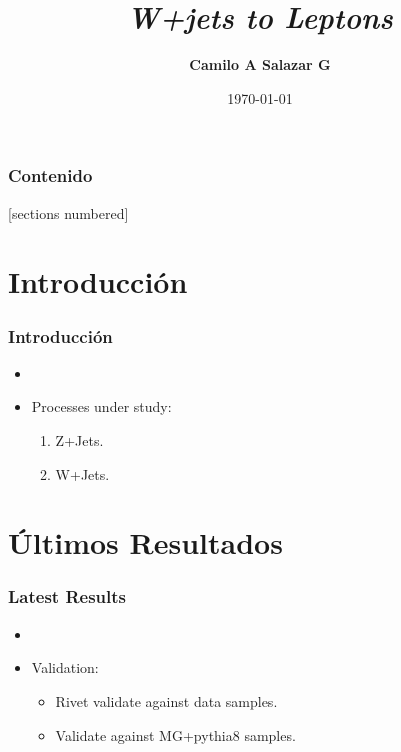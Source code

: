 \documentclass{beamer}
\title{\textbf{ \textit{W+jets to Leptons}}}
\author[C.Salazar]{\textbf{Camilo A Salazar G} }
\institute[UdeA]{camilo.salazar@cern.ch}
\date{\today}
\numberwithin{figure}{section}
\begin{document}

\begin{frame}[plain,t]
\titlepage
\end{frame}



\begin{frame}
  \addtocounter{framenumber}{-1}
  \scriptsize
  \frametitle{Contenido}
  [sections numbered]
  \tableofcontents[hideallsubsections]
\end{frame}


\section{Introducción}

\begin{frame}
    \frametitle{Introducción}
    \justifying{}
    
    \begin{itemize}
        \item[]
        \item[] Processes under study:
        \begin{enumerate}
            \item Z+Jets.
            \item W+Jets.
        \end{enumerate}
    \end{itemize}


\end{frame}


\section{Últimos Resultados}
\begin{frame}
 \frametitle{Latest Results}
 
 
 \begin{itemize}
    \item[] 
    \item[] Validation:
    \begin{itemize}
         \item Rivet validate against data samples.
        \item Validate against MG+pythia8 samples.
     \end{itemize}
 \end{itemize} 
 
\end{frame}
\end{document}
